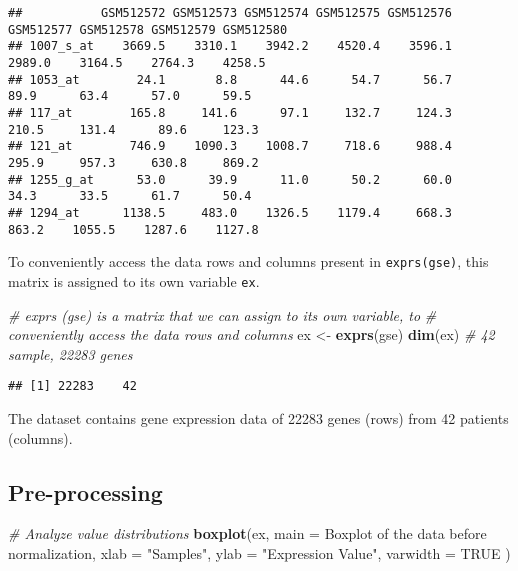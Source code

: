 \documentclass[
]{article}
\newenvironment{Shaded}{\begin{snugshade}}{\end{snugshade}}
\newcommand{\AttributeTok}[1]{\textcolor[rgb]{0.13,0.29,0.53}{#1}}
\newcommand{\CommentTok}[1]{\textcolor[rgb]{0.56,0.35,0.01}{\textit{#1}}}
\newcommand{\ConstantTok}[1]{\textcolor[rgb]{0.56,0.35,0.01}{#1}}
\newcommand{\FunctionTok}[1]{\textcolor[rgb]{0.13,0.29,0.53}{\textbf{#1}}}
\newcommand{\NormalTok}[1]{#1}
\newcommand{\OtherTok}[1]{\textcolor[rgb]{0.56,0.35,0.01}{#1}}
\newcommand{\StringTok}[1]{\textcolor[rgb]{0.31,0.60,0.02}{#1}}
\begin{document}
\begin{verbatim}
##           GSM512572 GSM512573 GSM512574 GSM512575 GSM512576 GSM512577 GSM512578 GSM512579 GSM512580
## 1007_s_at    3669.5    3310.1    3942.2    4520.4    3596.1    2989.0    3164.5    2764.3    4258.5
## 1053_at        24.1       8.8      44.6      54.7      56.7      89.9      63.4      57.0      59.5
## 117_at        165.8     141.6      97.1     132.7     124.3     210.5     131.4      89.6     123.3
## 121_at        746.9    1090.3    1008.7     718.6     988.4     295.9     957.3     630.8     869.2
## 1255_g_at      53.0      39.9      11.0      50.2      60.0      34.3      33.5      61.7      50.4
## 1294_at      1138.5     483.0    1326.5    1179.4     668.3     863.2    1055.5    1287.6    1127.8
\end{verbatim}

To conveniently access the data rows and columns present in
\texttt{exprs(gse)}, this matrix is assigned to its own variable
\texttt{ex}.

\begin{Shaded}
\begin{Highlighting}[]
\CommentTok{\# exprs (gse) is a matrix that we can assign to its own variable, to}
\CommentTok{\# conveniently access the data rows and columns}
\NormalTok{ex }\OtherTok{\textless{}{-}} \FunctionTok{exprs}\NormalTok{(gse)}
\FunctionTok{dim}\NormalTok{(ex) }\CommentTok{\# 42 sample, 22283 genes}
\end{Highlighting}
\end{Shaded}

\begin{verbatim}
## [1] 22283    42
\end{verbatim}

The dataset contains gene expression data of 22283 genes (rows) from 42
patients (columns).

\subsection{Pre-processing}\label{pre-processing}

\begin{Shaded}
\begin{Highlighting}[]
\CommentTok{\# Analyze value distributions}
\FunctionTok{boxplot}\NormalTok{(ex, }\AttributeTok{main =} \StringTok{\textquotesingle{}Boxplot of the data before normalization\textquotesingle{}}\NormalTok{,}
        \AttributeTok{xlab =} \StringTok{"Samples"}\NormalTok{,}
        \AttributeTok{ylab =} \StringTok{"Expression Value"}\NormalTok{,}
        \AttributeTok{varwidth =} \ConstantTok{TRUE}
\NormalTok{        )}
\end{Highlighting}
\end{Shaded}
\end{document}
